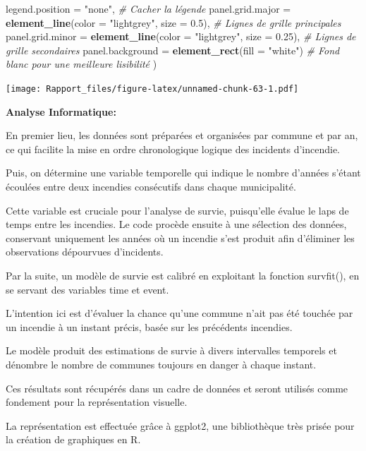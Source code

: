 \documentclass[
]{article}
\newenvironment{Shaded}{\begin{snugshade}}{\end{snugshade}}
\newcommand{\AttributeTok}[1]{\textcolor[rgb]{0.13,0.29,0.53}{#1}}
\newcommand{\CommentTok}[1]{\textcolor[rgb]{0.56,0.35,0.01}{\textit{#1}}}
\newcommand{\FloatTok}[1]{\textcolor[rgb]{0.00,0.00,0.81}{#1}}
\newcommand{\FunctionTok}[1]{\textcolor[rgb]{0.13,0.29,0.53}{\textbf{#1}}}
\newcommand{\NormalTok}[1]{#1}
\newcommand{\StringTok}[1]{\textcolor[rgb]{0.31,0.60,0.02}{#1}}
\begin{document}
\begin{Shaded}
\begin{Highlighting}[]
    \AttributeTok{legend.position =} \StringTok{"none"}\NormalTok{,  }\CommentTok{\# Cacher la légende}
    \AttributeTok{panel.grid.major =} \FunctionTok{element\_line}\NormalTok{(}\AttributeTok{color =} \StringTok{"lightgrey"}\NormalTok{, }\AttributeTok{size =} \FloatTok{0.5}\NormalTok{),  }\CommentTok{\# Lignes de grille principales}
    \AttributeTok{panel.grid.minor =} \FunctionTok{element\_line}\NormalTok{(}\AttributeTok{color =} \StringTok{"lightgrey"}\NormalTok{, }\AttributeTok{size =} \FloatTok{0.25}\NormalTok{),  }\CommentTok{\# Lignes de grille secondaires}
    \AttributeTok{panel.background =} \FunctionTok{element\_rect}\NormalTok{(}\AttributeTok{fill =} \StringTok{"white"}\NormalTok{)  }\CommentTok{\# Fond blanc pour une meilleure lisibilité}
\NormalTok{  )}
\end{Highlighting}
\end{Shaded}

\texttt{[image: Rapport\_files/figure-latex/unnamed-chunk-63-1.pdf]}

\textbf{Analyse Informatique:}

En premier lieu, les données sont préparées et organisées par commune et
par an, ce qui facilite la mise en ordre chronologique logique des
incidents d'incendie.

Puis, on détermine une variable temporelle qui indique le nombre
d'années s'étant écoulées entre deux incendies consécutifs dans chaque
municipalité.

Cette variable est cruciale pour l'analyse de survie, puisqu'elle évalue
le laps de temps entre les incendies. Le code procède ensuite à une
sélection des données, conservant uniquement les années où un incendie
s'est produit afin d'éliminer les observations dépourvues d'incidents.

Par la suite, un modèle de survie est calibré en exploitant la fonction
survfit(), en se servant des variables time et event.

L'intention ici est d'évaluer la chance qu'une commune n'ait pas été
touchée par un incendie à un instant précis, basée sur les précédents
incendies.

Le modèle produit des estimations de survie à divers intervalles
temporels et dénombre le nombre de communes toujours en danger à chaque
instant.

Ces résultats sont récupérés dans un cadre de données et seront utilisés
comme fondement pour la représentation visuelle.

La représentation est effectuée grâce à ggplot2, une bibliothèque très
prisée pour la création de graphiques en R.
\end{document}

